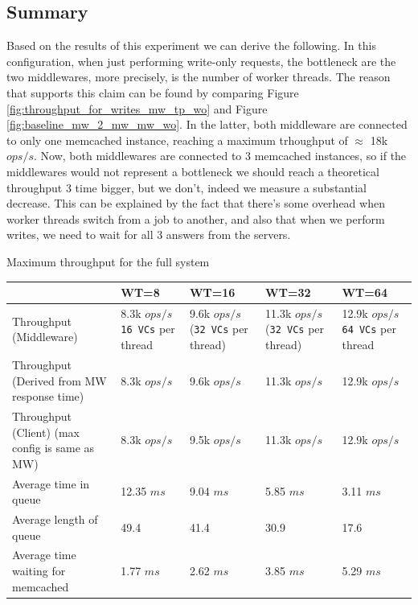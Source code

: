\documentclass[11pt,a4paper]{article}
\begin{document}
\subsection{Summary}

Based on the results of this experiment we can derive the following.
In this configuration, when just performing write-only requests, the bottleneck are the two middlewares, more precisely, is the number of worker threads. 
The reason that supports this claim can be found by comparing Figure \ref{fig:throughput_for_writes_mw_tp_wo} and Figure \ref{fig:baseline_mw_2_mw_mw_wo}. In the latter, both middleware are connected to only one memcached instance, reaching a maximum trhoughput of $\approx$ 18k $ops/s$. Now, both middlewares are connected to 3 memcached instances, so if the middlewares would not represent a bottleneck we should reach a theoretical throughput 3 time bigger, but we don't, indeed we measure a substantial decrease. This can be explained by the fact  that there's some overhead when worker threads switch from a job to another, and also that when we perform writes, we need to wait for all 3 answers from the servers.\\


\begin{center}
	{Maximum throughput for the full system}
    \scriptsize{
	\begin{tabular}{|l|p{1.5cm}|p{1.5cm}|p{1.5cm}|p{1.5cm}|}
		\hline                                            & WT=8         & WT=16        & WT=32         & WT=64         \\ 
        \hline Throughput (Middleware)                    & 8.3k $ops/s$ \texttt{16 VCs} per thread & 9.6k $ops/s$ (\texttt{32 VCs} per thread) & 11.3k $ops/s$ (\texttt{32 VCs} per thread)& 12.9k $ops/s$ \texttt{64 VCs} per thread\\ 
		\hline Throughput (Derived from MW response time) & 8.3k $ops/s$ & 9.6k $ops/s$ & 11.3k $ops/s$ & 12.9k $ops/s$ \\ 
        \hline Throughput (Client) (max config is same as MW)                       & 8.3k $ops/s$ & 9.5k $ops/s$ & 11.3k $ops/s$ & 12.9k $ops/s$ \\ 
		\hline Average time in queue                      & 12.35 $ms$   & 9.04 $ms$    & 5.85 $ms$     & 3.11 $ms$     \\ 
		\hline Average length of queue                    & 49.4         & 41.4         & 30.9          & 17.6          \\ 
		\hline Average time waiting for memcached         & 1.77 $ms$    & 2.62 $ms$    & 3.85 $ms$     & 5.29 $ms$     \\ 
		\hline 
	\end{tabular}
}
\end{center}
\end{document}
